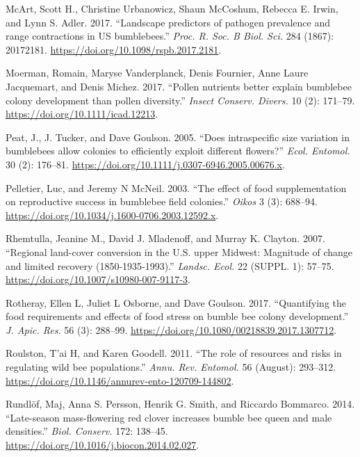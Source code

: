 \documentclass[11pt,]{article}
\begin{document}
\leavevmode\hypertarget{ref-McArt2017}{}%
McArt, Scott H., Christine Urbanowicz, Shaun McCoshum, Rebecca E. Irwin,
and Lynn S. Adler. 2017. ``Landscape predictors of pathogen prevalence
and range contractions in US bumblebees.'' \emph{Proc. R. Soc. B Biol.
Sci.} 284 (1867): 20172181.
\url{https://doi.org/10.1098/rspb.2017.2181}.

\leavevmode\hypertarget{ref-Moerman2017}{}%
Moerman, Romain, Maryse Vanderplanck, Denis Fournier, Anne Laure
Jacquemart, and Denis Michez. 2017. ``Pollen nutrients better explain
bumblebee colony development than pollen diversity.'' \emph{Insect
Conserv. Divers.} 10 (2): 171--79.
\url{https://doi.org/10.1111/icad.12213}.

\leavevmode\hypertarget{ref-Peat2005}{}%
Peat, J., J. Tucker, and Dave Goulson. 2005. ``Does intraspecific size
variation in bumblebees allow colonies to efficiently exploit different
flowers?'' \emph{Ecol. Entomol.} 30 (2): 176--81.
\url{https://doi.org/10.1111/j.0307-6946.2005.00676.x}.

\leavevmode\hypertarget{ref-Pelletier2003}{}%
Pelletier, Luc, and Jeremy N McNeil. 2003. ``The effect of food
supplementation on reproductive success in bumblebee field colonies.''
\emph{Oikos} 3 (3): 688--94.
\url{https://doi.org/10.1034/j.1600-0706.2003.12592.x}.

\leavevmode\hypertarget{ref-Rhemtulla2007}{}%
Rhemtulla, Jeanine M., David J. Mladenoff, and Murray K. Clayton. 2007.
``Regional land-cover conversion in the U.S. upper Midwest: Magnitude of
change and limited recovery (1850-1935-1993).'' \emph{Landsc. Ecol.} 22
(SUPPL. 1): 57--75. \url{https://doi.org/10.1007/s10980-007-9117-3}.

\leavevmode\hypertarget{ref-Rotheray2017}{}%
Rotheray, Ellen L, Juliet L Osborne, and Dave Goulson. 2017.
``Quantifying the food requirements and effects of food stress on bumble
bee colony development.'' \emph{J. Apic. Res.} 56 (3): 288--99.
\url{https://doi.org/10.1080/00218839.2017.1307712}.

\leavevmode\hypertarget{ref-Roulston2011}{}%
Roulston, T'ai H, and Karen Goodell. 2011. ``The role of resources and
risks in regulating wild bee populations.'' \emph{Annu. Rev. Entomol.}
56 (August): 293--312.
\url{https://doi.org/10.1146/annurev-ento-120709-144802}.

\leavevmode\hypertarget{ref-Rundlof2014}{}%
Rundlöf, Maj, Anna S. Persson, Henrik G. Smith, and Riccardo Bommarco.
2014. ``Late-season mass-flowering red clover increases bumble bee queen
and male densities.'' \emph{Biol. Conserv.} 172: 138--45.
\url{https://doi.org/10.1016/j.biocon.2014.02.027}.
\end{document}
